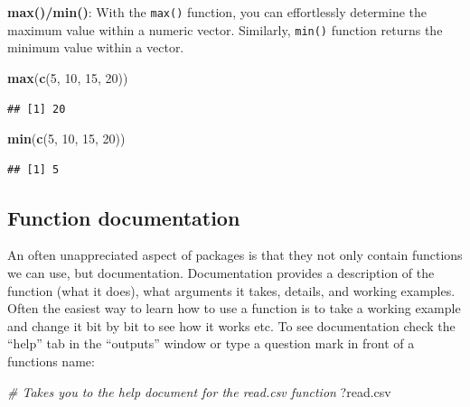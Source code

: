 \documentclass[
]{book}
\newenvironment{Shaded}{\begin{snugshade}}{\end{snugshade}}
\newcommand{\CommentTok}[1]{\textcolor[rgb]{0.56,0.35,0.01}{\textit{#1}}}
\newcommand{\DecValTok}[1]{\textcolor[rgb]{0.00,0.00,0.81}{#1}}
\newcommand{\FunctionTok}[1]{\textcolor[rgb]{0.13,0.29,0.53}{\textbf{#1}}}
\newcommand{\NormalTok}[1]{#1}
\begin{document}
\textbf{max()/min()}: With the \texttt{max()} function, you can effortlessly determine the maximum value within a numeric vector. Similarly, \texttt{min()} function returns the minimum value within a vector.

\begin{Shaded}
\begin{Highlighting}[]
\FunctionTok{max}\NormalTok{(}\FunctionTok{c}\NormalTok{(}\DecValTok{5}\NormalTok{, }\DecValTok{10}\NormalTok{, }\DecValTok{15}\NormalTok{, }\DecValTok{20}\NormalTok{))}
\end{Highlighting}
\end{Shaded}

\begin{verbatim}
## [1] 20
\end{verbatim}

\begin{Shaded}
\begin{Highlighting}[]
\FunctionTok{min}\NormalTok{(}\FunctionTok{c}\NormalTok{(}\DecValTok{5}\NormalTok{, }\DecValTok{10}\NormalTok{, }\DecValTok{15}\NormalTok{, }\DecValTok{20}\NormalTok{))}
\end{Highlighting}
\end{Shaded}

\begin{verbatim}
## [1] 5
\end{verbatim}

\hypertarget{function-documentation}{%
\subsection{Function documentation}\label{function-documentation}}

An often unappreciated aspect of packages is that they not only contain functions we can use, but documentation. Documentation provides a description of the function (what it does), what arguments it takes, details, and working examples. Often the easiest way to learn how to use a function is to take a working example and change it bit by bit to see how it works etc. To see documentation check the ``help'' tab in the ``outputs'' window or type a question mark in front of a functions name:

\begin{Shaded}
\begin{Highlighting}[]
\CommentTok{\# Takes you to the help document for the read.csv function}
\NormalTok{?read.csv}
\end{Highlighting}
\end{Shaded}
\end{document}

